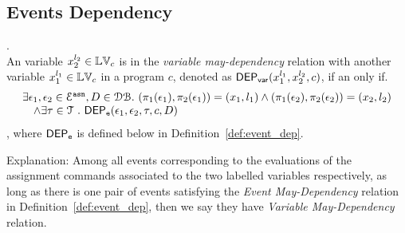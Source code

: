 %
%
%
\subsection{Events Dependency}
%
\begin{defn}.
  \label{def:var_dep}
  \\
  An variable ${x}_2^{l_2} \in \mathbb{LV}_{{c}}$ is in the \emph{variable may-dependency} relation with another
  variable ${x}_1^{l_1} \in \mathbb{LV}_{{c}}$ in a program ${c}$, denoted as 
  $\mathsf{DEP_{var}}({x}_1^{l_1}, {x}_2^{l_2}, {c})$, if an only if.
\[
  \begin{array}{l}
\exists \mathtt{\epsilon}_1, \mathtt{\epsilon}_2 \in \mathcal{E}^{\mathtt{{asn}}}, D \in \mathcal{DB}. ~
(\pi_{1}{(\mathtt{\epsilon}_1)}, \pi_{2}{(\mathtt{\epsilon}_1)}) = ({x}_1, l_1)
\land
(\pi_{1}{(\mathtt{\epsilon}_2)}, \pi_{2}{(\mathtt{\epsilon}_2)}) = ({x}_2, l_2)
\\ \quad 
\land 
\exists \mathtt{\tau} \in \mathcal{T} ~.~ 
\mathsf{DEP_{\mathtt{e}}}(\mathtt{\epsilon}_1, \mathtt{\epsilon}_2, \mathtt{\tau}, c, D) 
  \end{array}
\]  %
, where $\mathsf{DEP_{\mathtt{e}}}$ is defined below in Definition~\ref{def:event_dep}.
  \end{defn}
Explanation: 
Among all events corresponding to the evaluations of the assignment commands associated to the two labelled variables respectively, 
as long as there is one pair of events satisfying the \emph{Event May-Dependency} relation in Definition~\ref{def:event_dep}, 
then we say they have \emph{Variable May-Dependency} relation.
